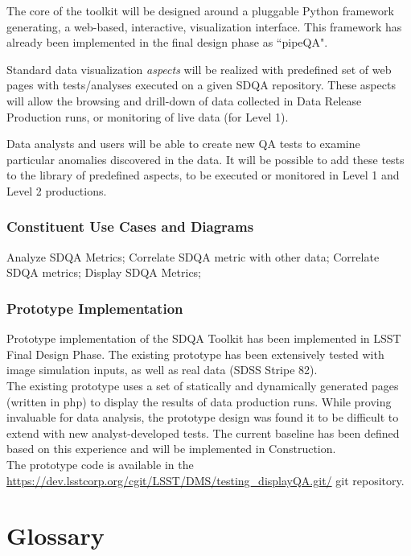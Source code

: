 \documentclass[12pt]{article}
\begin{document}
The core of the toolkit will be designed around a pluggable Python framework generating, a web-based, interactive, visualization interface. This framework has already been implemented in the final design phase as ``pipeQA".

Standard data visualization {\em aspects} will be realized with predefined set of web pages with tests/analyses executed on a given SDQA repository. These aspects will allow the browsing and drill-down of data collected in Data Release Production runs, or monitoring of live data (for Level 1).

Data analysts and users will be able to create new QA tests to examine particular anomalies discovered in the data. It will be possible to add these tests to the library of predefined aspects, to be executed or monitored in Level 1 and Level 2 productions.

\subsubsection{Constituent Use Cases and Diagrams}

Analyze SDQA Metrics;
Correlate SDQA metric with other data;
Correlate SDQA metrics;
Display SDQA Metrics;

\subsubsection{Prototype Implementation}

Prototype implementation of the SDQA Toolkit has been implemented in LSST Final Design Phase. The existing prototype has been extensively tested with image simulation inputs, as well as real data (SDSS Stripe 82).
\\

The existing prototype uses a set of statically and dynamically generated pages (written in php) to display the results of data production runs. While proving invaluable for data analysis, the prototype design was found it to be difficult to extend with new analyst-developed tests. The current baseline has been defined based on this experience and will be implemented in Construction.
\\

The prototype code is available in the \url{https://dev.lsstcorp.org/cgit/LSST/DMS/testing_displayQA.git/} git repository.

\clearpage

\section{Glossary}
\end{document}
